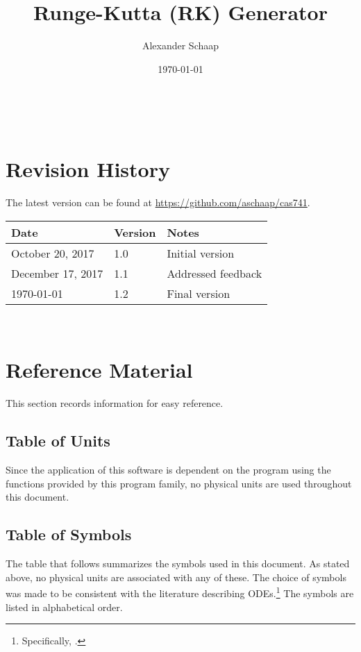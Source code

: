 \documentclass[12pt]{article}
\begin{document}
\title{Runge-Kutta (RK) Generator} 
\author{Alexander Schaap}
\date{\today}

\maketitle

~\newpage


\section{Revision History}
The latest version can be found at \url{https://github.com/aschaap/cas741}.\\

\noindent
\begin{tabularx}{\textwidth}{p{3.5cm}p{2cm}X}
\toprule {\bf Date} & {\bf Version} & {\bf Notes}\\
\midrule
October 20, 2017 & 1.0 & Initial version\\
December 17, 2017 & 1.1 & Addressed feedback\\
\today & 1.2 & Final version\\
\bottomrule
\end{tabularx}

~\newpage
	
\section{Reference Material}

This section records information for easy reference.

\subsection{Table of Units}

Since the application of this software is dependent on the program using the 
functions provided by this program family, no physical units are used 
throughout this document.

\subsection{Table of Symbols}\label{ssec:symbols}

The table that follows summarizes the symbols used in this document. As stated 
above, no physical units are associated with any of these.  The choice of 
symbols was made to be consistent with the 
literature describing ODEs.\footnote{Specifically, 
\cite{corless_graduate_2013}.}  The symbols are listed in alphabetical order.
\end{document}

